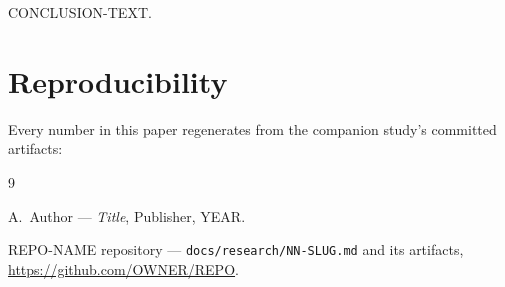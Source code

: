 \documentclass[11pt,a4paper]{article}
\begin{document}
CONCLUSION-TEXT.

\section*{Reproducibility}

Every number in this paper regenerates from the companion study's committed
artifacts:

\begin{quote}
\end{quote}

\begin{thebibliography}{9}

A.~Author --- \textit{Title}, Publisher, YEAR.

REPO-NAME repository --- \texttt{docs/research/NN-SLUG.md} and its
artifacts, \url{https://github.com/OWNER/REPO}.

\end{thebibliography}
\end{document}
